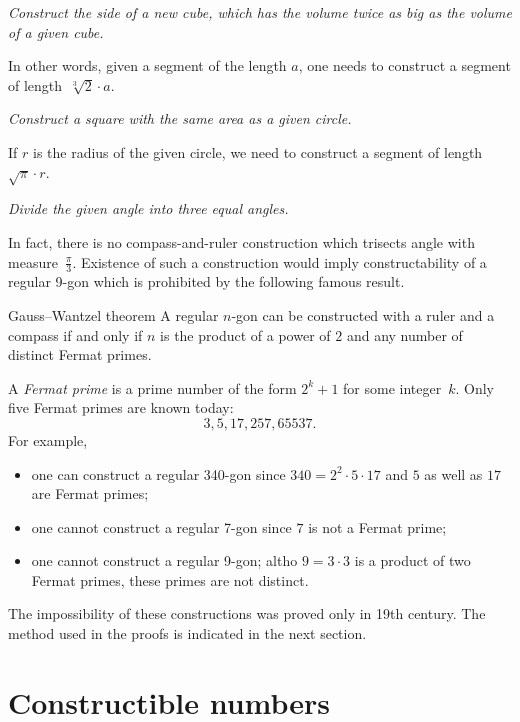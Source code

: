  {\it Construct the side of a new cube, 
which has the volume twice as big as the volume of a given cube.} 

\medskip

In other words, 
given a segment of the length $a$,
one needs to construct a segment of length~$\sqrt[3]{2}\cdot a$.

 {\it Construct a square with the same area as a given circle.} 

\medskip

If $r$ is the radius of the given circle, we need to construct a segment of length~$\sqrt{\pi}\cdot r$. 

{\it Divide the given angle into three equal angles.}

\medskip

In fact, there is no compass-and-ruler construction which trisects angle with measure~$\tfrac\pi3$. 
Existence of such a construction would imply constructability of a regular 9-gon which is prohibited by the following famous result.

\begin{thm}{Gauss--Wantzel theorem}
A regular $n$-gon can be constructed with a ruler and a compass 
if and only if 
$n$ is the product of a power of $2$ and any number of distinct Fermat primes.
\end{thm}

A \emph{Fermat prime} is a prime number of the form $2^k+1$ for some integer~$k$.
Only five Fermat primes are known  today:
$$3, 5, 17, 257, 65537.$$
For example, 
\begin{itemize}
\item one can construct a regular 340-gon since $340=2^2\cdot 5\cdot 17$ and $5$ as well as $17$ are Fermat primes;
\item one cannot construct a regular 7-gon since $7$ is not a Fermat prime;
\item one cannot construct a regular 9-gon; 
altho $9=3\cdot 3$ is a product of two Fermat primes, 
these primes are not distinct.
\end{itemize}

\medskip

The impossibility of these constructions 
was proved only in 19th century.
The method used in the proofs is indicated in the next section.

\section*{Constructible numbers}

